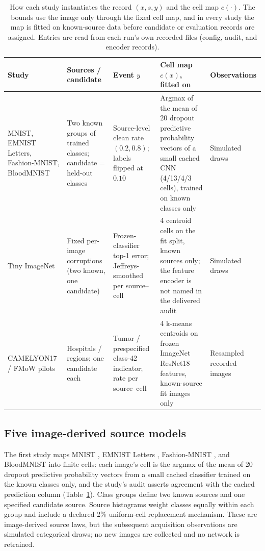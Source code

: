 \documentclass[11pt]{article}
\begin{document}
\begin{table}[htbp]
\centering
\small
\setlength{\tabcolsep}{4pt}
\begin{tabular}{@{}p{1.00in}p{1.25in}p{1.30in}p{1.55in}p{0.80in}@{}}
\toprule
Study & Sources / candidate & Event $y$ & Cell map $c(x)$, fitted on & Observations \\
\midrule
MNIST, EMNIST Letters, Fashion-MNIST, BloodMNIST & Two known groups of trained classes; candidate = held-out classes & Source-level clean rate $(0.2, 0.8)$; labels flipped at $0.10$ & Argmax of the mean of 20 dropout predictive probability vectors of a small cached CNN (4/13/4/3 cells), trained on known classes only & Simulated draws \\
\addlinespace
Tiny ImageNet & Fixed per-image corruptions (two known, one candidate) & Frozen-classifier top-1 error; Jeffreys-smoothed per source--cell & 4 centroid cells on the fit split, known sources only; the feature encoder is not named in the delivered audit & Simulated draws \\
\addlinespace
CAMELYON17 / FMoW pilots & Hospitals / regions; one candidate each & Tumor / prespecified class-42 indicator; rate per source--cell & 4 k-means centroids on frozen ImageNet ResNet18 features, known-source fit images only & Resampled recorded images \\
\bottomrule
\end{tabular}
\caption{How each study instantiates the record $(x,s,y)$ and the cell map $c(\cdot)$. The bounds use the image only through the fixed cell map, and in every study the map is fitted on known-source data before candidate or evaluation records are assigned. Entries are read from each run's own recorded files (config, audit, and encoder records).}
\label{tab:instances}
\end{table}

\subsection{Five image-derived source models}

The first study maps MNIST \citep{lecun}, EMNIST Letters \citep{cohen2017}, Fashion-MNIST \citep{xiao2017}, and BloodMNIST \citep{yang2023} into finite cells: each image's cell is the argmax of the mean of 20 dropout predictive probability vectors from a small cached classifier trained on the known classes only, and the study's audit asserts agreement with the cached prediction column (Table~\ref{tab:instances}). Class groups define two known sources and one specified candidate source. Source histograms weight classes equally within each group and include a declared 2\% uniform-cell replacement mechanism. These are image-derived source laws, but the subsequent acquisition observations are simulated categorical draws; no new images are collected and no network is retrained.
\end{document}
